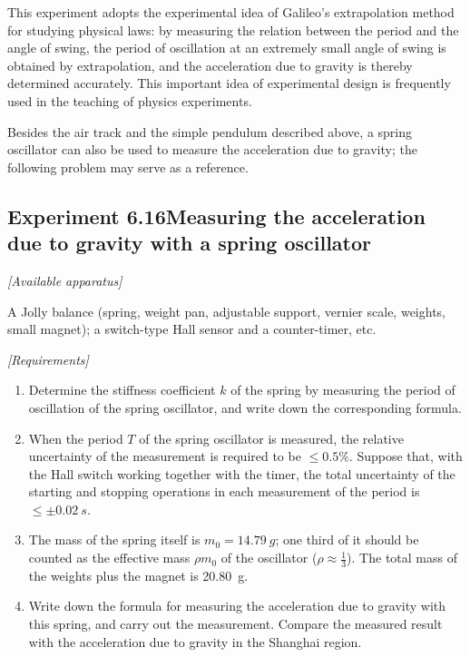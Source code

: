 \begin{commentary}
This experiment adopts the experimental idea of Galileo's extrapolation method for studying physical laws: by measuring the relation between the period and the angle of swing, the period of oscillation at an extremely small angle of swing is obtained by extrapolation, and the acceleration due to gravity is thereby determined accurately. This important idea of experimental design is frequently used in the teaching of physics experiments.

Besides the air track and the simple pendulum described above, a spring oscillator can also be used to measure the acceleration due to gravity; the following problem may serve as a reference.
\end{commentary}

\subsection*{Experiment 6.16\quad Measuring the acceleration due to gravity with a spring oscillator}

\noindent\textit{[Available apparatus]}

A Jolly balance (spring, weight pan, adjustable support, vernier scale, weights, small magnet); a switch-type Hall sensor and a counter-timer, etc.

\noindent\textit{[Requirements]}
\begin{enumerate}[label=(\arabic*),leftmargin=2.2em,itemsep=1pt,topsep=2pt]
\item Determine the stiffness coefficient $k$ of the spring by measuring the period of oscillation of the spring oscillator, and write down the corresponding formula.
\item When the period $T$ of the spring oscillator is measured, the relative uncertainty of the measurement is required to be $\le 0.5\%$. Suppose that, with the Hall switch working together with the timer, the total uncertainty of the starting and stopping operations in each measurement of the period is $\le\pm\SI{0.02}{s}$.
\item The mass of the spring itself is $m_0=\SI{14.79}{g}$; one third of it should be counted as the effective mass $\rho m_0$ of the oscillator ($\rho\approx\frac{1}{3}$). The total mass of the weights plus the magnet is \SI{20.80}{g}.
\item Write down the formula for measuring the acceleration due to gravity with this spring, and carry out the measurement. Compare the measured result with the acceleration due to gravity in the Shanghai region.
\end{enumerate}

